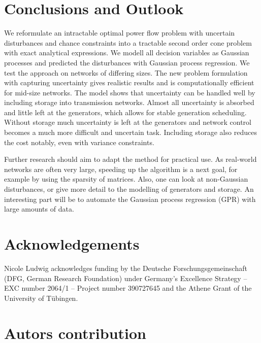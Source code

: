 \documentclass[final,3p,times,twocolumn]{elsarticle}  %
\begin{document}

\section{Conclusions and Outlook}
\label{sec:conclusion}

We reformulate an intractable optimal power flow problem with uncertain disturbances and chance constraints into a tractable second order cone problem with exact analytical expressions. We modell all decision variables as Gaussian processes and predicted the disturbances with Gaussian process regression.
We test the approach on networks of differing sizes.
The new problem formulation with \gps capturing uncertainty gives realistic results and is computationally efficient for mid-size networks.
The model shows that uncertainty can be handled well by including storage into transmission networks. Almost all uncertainty is absorbed and little left at the generators, which allows for stable generation scheduling. 
Without storage much uncertainty is left at the generators and network control becomes a much more difficult and uncertain task.
Including storage also reduces the cost notably, even with variance constraints.

Further research should aim to adapt the method for practical use. 
As real-world networks are often very large, speeding up the algorithm is a next goal, for example by using the sparsity of matrices.
Also, one can look at non-Gaussian disturbances, or give more detail to the modelling of generators and storage. 
An interesting part will be to automate the Gaussian process regression (GPR) with large amounts of data.


\section{Acknowledgements}

Nicole Ludwig acknowledges funding by the Deutsche Forschungsgemeinschaft (DFG, German Research Foundation) under Germany’s Excellence Strategy – EXC number 2064/1 – Project number 390727645 and the Athene Grant of the University of Tübingen.


\section{Autors contribution}
\end{document}
